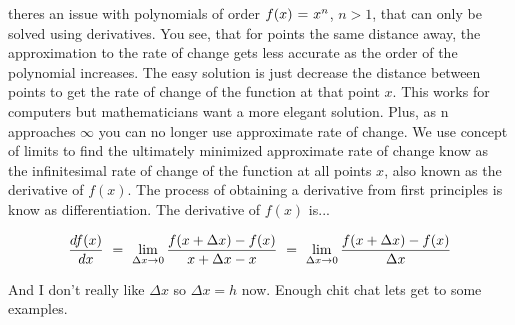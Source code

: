 \documentclass{article}
\begin{document}
theres an issue with polynomials of order \begin{math} f(x) \hspace{0.025cm} = \hspace{0.025cm} x^n \end{math}, \begin{math} n > 1 \end{math}, that can only be solved using derivatives. You see, that for points the same distance away, the approximation to the rate of change gets less accurate as the order of the polynomial increases. The easy solution is just decrease the distance between points to get the rate of change of the function at that point \begin{math} x \end{math}. This works for computers but mathematicians want a more elegant solution. Plus, as n approaches \begin{math} \infty \end{math} you can no longer use approximate rate of change. We use concept of limits to find the ultimately minimized approximate rate of change know as the infinitesimal rate of change of the function at all points \begin{math} x \end{math}, also known as the derivative of \begin{math} f(x) \end{math}. The process of obtaining a derivative from first principles is know as differentiation. The derivative of \begin{math} f(x) \end{math} is...

\begin{equation} \label{eq:306}
\frac{df(x)}{dx} \hspace{0.125cm} = \hspace{0.125cm} \lim_{\Delta x\to 0} \frac{f(x + \Delta x) - f(x)}{x + \Delta x - x} \hspace{0.125cm} = \hspace{0.125cm} \lim_{\Delta x\to 0} \frac{f(x + \Delta x) - f(x)}{\Delta x}
\end{equation}

And I don't really like \begin{math} \Delta x \end{math} so \begin{math} \Delta x = h \end{math} now. Enough chit chat lets get to some examples. 
\end{document}
